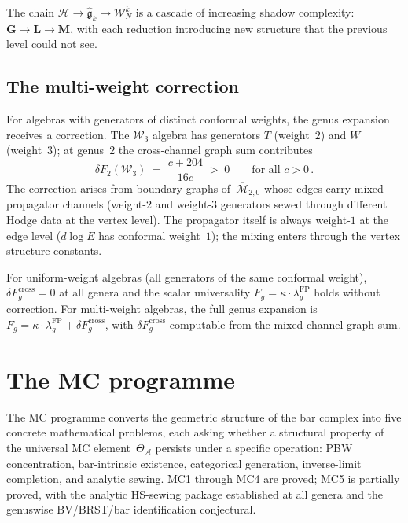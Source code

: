 \documentclass[11pt,reqno]{amsart}
\theoremstyle{definition}
\theoremstyle{remark}
\newcommand{\cA}{\mathcal{A}}
\newcommand{\cH}{\mathcal{H}}
\newcommand{\cM}{\mathcal{M}}
\newcommand{\cW}{\mathcal{W}}
\newcommand{\fg}{\mathfrak{g}}
\numberwithin{equation}{section}
\begin{document}
The chain $\cH \to \widehat{\fg}_k \to \cW^k_N$ is a
cascade of increasing shadow complexity:
$\mathbf{G} \to \mathbf{L} \to \mathbf{M}$, with each
reduction introducing new structure that the previous
level could not see.


\subsection{The multi-weight correction}
\label{ssec:multi-weight-landscape}

For algebras with generators of distinct conformal
weights, the genus expansion
receives a correction. The $\cW_3$ algebra has generators
$T$ (weight~$2$) and $W$ (weight~$3$); at genus~$2$ the
cross-channel graph sum contributes
\begin{equation}\label{eq:delta-f2-w3}
\delta F_2(\cW_3)
\;=\;
\frac{c + 204}{16c}
\;>\; 0
\qquad
\text{for all } c > 0\,.
\end{equation}
The correction arises from boundary graphs
of~$\overline{\cM}_{2,0}$ whose edges carry mixed
propagator channels (weight-$2$ and weight-$3$ generators
sewed through different Hodge data at the vertex level).
The propagator itself is always weight-$1$ at the edge
level ($d\log E$ has conformal weight~$1$); the mixing
enters through the vertex structure constants.

For uniform-weight algebras (all generators of the same
conformal weight), $\delta F_g^{\mathrm{cross}} = 0$
at all genera and the scalar universality
$F_g = \kappa \cdot \lambda_g^{\mathrm{FP}}$ holds
without correction. For multi-weight algebras, the
full genus expansion is
$F_g = \kappa \cdot \lambda_g^{\mathrm{FP}}
+ \delta F_g^{\mathrm{cross}}$,
with
$\delta F_g^{\mathrm{cross}}$ computable from the
mixed-channel graph sum.


\section{The MC programme}
\label{sec:mc-programme}

The MC programme converts the geometric structure of the
bar complex into five concrete mathematical problems, each
asking whether a structural property of the universal MC
element~$\Theta_\cA$ persists under a specific operation:
PBW concentration, bar-intrinsic existence, categorical
generation, inverse-limit completion, and analytic sewing.
MC1 through MC4 are proved; MC5 is partially proved, with
the analytic HS-sewing package established at all genera
and the genuswise BV/BRST/bar identification conjectural.
\end{document}
